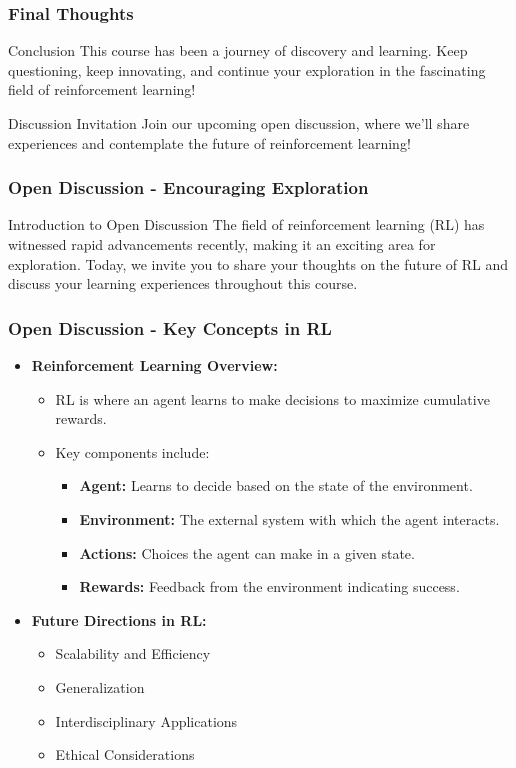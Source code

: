 \documentclass[aspectratio=169]{beamer}
\begin{document}
\begin{frame}
    \frametitle{Final Thoughts}
    \begin{block}{Conclusion}
        This course has been a journey of discovery and learning. Keep questioning, keep innovating, and continue your exploration in the fascinating field of reinforcement learning!
    \end{block}
    \begin{block}{Discussion Invitation}
        Join our upcoming open discussion, where we'll share experiences and contemplate the future of reinforcement learning!
    \end{block}
\end{frame}

\begin{frame}[fragile]
    \frametitle{Open Discussion - Encouraging Exploration}
    \begin{block}{Introduction to Open Discussion}
        The field of reinforcement learning (RL) has witnessed rapid advancements recently, making it an exciting area for exploration. Today, we invite you to share your thoughts on the future of RL and discuss your learning experiences throughout this course.
    \end{block}
\end{frame}

\begin{frame}[fragile]
    \frametitle{Open Discussion - Key Concepts in RL}
    \begin{itemize}
        \item \textbf{Reinforcement Learning Overview:}
        \begin{itemize}
            \item RL is where an agent learns to make decisions to maximize cumulative rewards.
            \item Key components include:
            \begin{itemize}
                \item \textbf{Agent:} Learns to decide based on the state of the environment.
                \item \textbf{Environment:} The external system with which the agent interacts.
                \item \textbf{Actions:} Choices the agent can make in a given state.
                \item \textbf{Rewards:} Feedback from the environment indicating success.
            \end{itemize}
        \end{itemize}
        
        \item \textbf{Future Directions in RL:}
        \begin{itemize}
            \item Scalability and Efficiency
            \item Generalization
            \item Interdisciplinary Applications
            \item Ethical Considerations
        \end{itemize}
    \end{itemize}
\end{frame}
\end{document}

